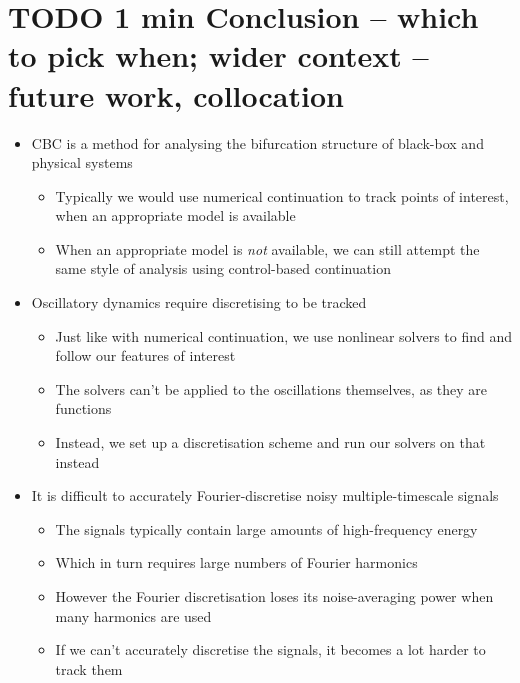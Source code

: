 \documentclass[11pt]{article}
\begin{document}
\section{{\bfseries\sffamily TODO} 1 min Conclusion -- which to pick when; wider context -- future work, collocation}
\label{sec:org72dd3b7}
\begin{itemize}
\item CBC is a method for analysing the bifurcation structure of black-box and physical systems
\begin{itemize}
\item Typically we would use numerical continuation to track points of interest, when an appropriate model is available
\item When an appropriate model is \emph{not} available, we can still attempt the same style of analysis using control-based continuation
\end{itemize}

\item Oscillatory dynamics require discretising to be tracked
\begin{itemize}
\item Just like with numerical continuation, we use nonlinear solvers to find and follow our features of interest
\item The solvers can't be applied to the oscillations themselves, as they are functions
\item Instead, we set up a discretisation scheme and run our solvers on that instead
\end{itemize}

\item It is difficult to accurately Fourier-discretise noisy multiple-timescale signals
\begin{itemize}
\item The signals typically contain large amounts of high-frequency energy
\item Which in turn requires large numbers of Fourier harmonics
\item However the Fourier discretisation loses its noise-averaging power when many harmonics are used
\item If we can't accurately discretise the signals, it becomes a lot harder to track them
\end{itemize}


\end{itemize}
\end{document}
